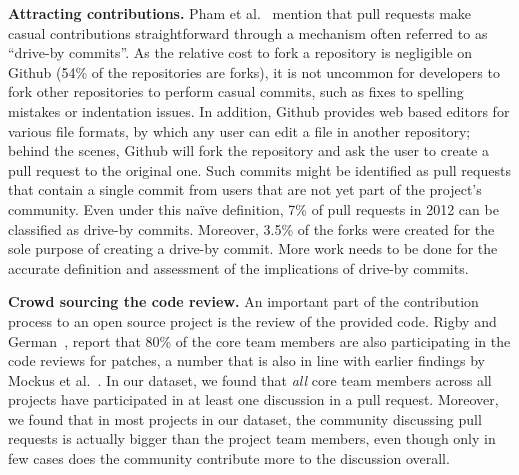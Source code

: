 \documentclass{sig-alternate}
\begin{document}
%
\textbf{Attracting contributions.} Pham et al.~\cite{Pham13} mention
that pull requests make casual contributions straightforward through
a mechanism often referred to as ``drive-by commits''. As the
relative cost to fork a repository is negligible on Github (54\% of the
repositories are forks), it is not uncommon for developers to fork other
repositories to perform casual commits, such as fixes to spelling mistakes or
indentation issues. In addition, Github provides web based editors
for various file formats, by which any user can edit a file in another
repository; behind the scenes, Github will fork the repository and ask the user
to create a pull request to the original one. Such commits might be identified
as pull requests that contain a single commit from users that are not yet part
of the project's community. Even under this na\"ive definition, 7\% of pull
requests in 2012 can be classified as drive-by commits. Moreover, 3.5\% of the
forks were created for the sole purpose of creating a drive-by commit. More
work needs to be done for the accurate definition and assessment of the
implications of drive-by commits.

\textbf{Crowd sourcing the code review.}
An important part of the contribution process to an open source project is the
review of the provided code. Rigby and German~\cite{Rigby06},
report that 80\% of the core team members are also participating in the code
reviews for patches, a number that is also in line with earlier findings by
Mockus et al.~\cite{MOCKU02}. In our dataset, we found that \emph{all} core
team members across all projects have participated in at least
one discussion in a pull request. Moreover, we found that in most projects
in our dataset, the community discussing pull requests is actually bigger
than the project team members, even though only in few cases does the community
contribute more to the discussion overall.
\end{document}

